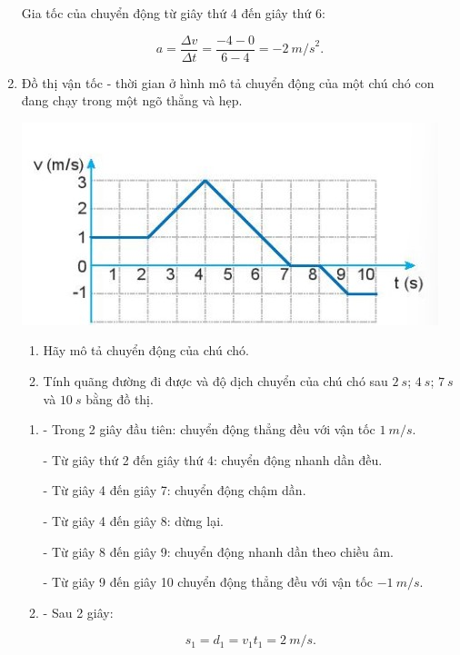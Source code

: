 \begin{enumerate}[label=\bfseries Câu \arabic*:]
	\hideall
	{	
		Gia tốc của chuyển động từ giây thứ 4 đến giây thứ 6:
		
		$$a = \dfrac{\Delta v}{\Delta t} =\dfrac{-4 - 0}{6-4}= -\SI{2}{m/s}^2.$$ 
	}
	\item {}

	
	{Đồ thị vận tốc - thời gian ở hình mô tả chuyển động của một chú chó con đang chạy trong một ngõ thẳng và hẹp.
		\begin{center}
			\includegraphics[scale=1]{../figs/VN10-2022-PH-TP012-5.jpg}
		\end{center}
		
		\begin{enumerate}[label=\alph*)]
			\item Hãy mô tả chuyển động của chú chó.
			\item Tính quãng đường đi được và độ dịch chuyển của chú chó sau $\SI{2}{s}$; $\SI{4}{s}$; $\SI{7}{s}$ và $\SI{10}{s}$ bằng đồ thị.
		\end{enumerate}
	}

	\hideall
	{	
		\begin{enumerate}[label=\alph*)]
			\item 
			- Trong 2 giây đầu tiên: chuyển động thẳng đều với vận tốc $\SI{1}{m/s}$.
			
			- Từ giây thứ 2 đến giây thứ 4: chuyển động nhanh dần đều.
			
			- Từ giây 4 đến giây 7: chuyển động chậm dần.
			
			- Từ giây 4 đến giây 8: dừng lại.
			
			- Từ giây 8 đến giây 9: chuyển động nhanh dần theo chiều âm.
			
			- Từ giây 9 đến giây 10 chuyển động thẳng đều với vận tốc $-\SI{1}{m/s}$.
			
		
			\item 
			- Sau 2 giây:
			
			$$s_1 = d_1 = v_1 t_1 = \SI{2}{m/s}.$$
			

\end{enumerate}}
\end{enumerate}
